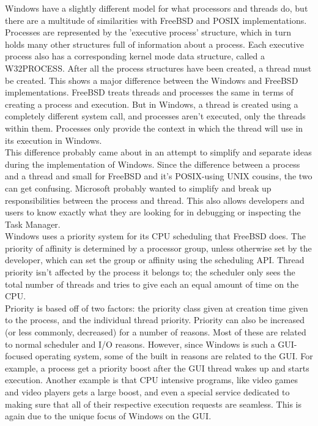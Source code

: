 \documentclass[titlepage]{article}
\begin{document}
\begin{singlespace}
    Windows have a slightly different model for what processors and threads do, but there are a multitude of similarities with FreeBSD and POSIX implementations. \\
    Processes are represented by the 'executive process' structure, which in turn holds many other structures full of information about a process. Each executive process also has a corresponding kernel mode data structure, called a W32PROCESS. After all the process structures have been created, a thread must be created. This shows a major difference between the Windows and FreeBSD implementations. FreeBSD treats threads and processes the same in terms of creating a process and execution. But in Windows, a thread is created using a completely different system call, and processes aren't executed, only the threads within them. Processes only provide the context in which the thread will use in its execution in Windows.\\
    This difference probably came about in an attempt to simplify and separate ideas during the implementation of Windows. Since the difference between a process and a thread and small for FreeBSD and it's POSIX-using UNIX cousins, the two can get confusing. Microsoft probably wanted to simplify and break up responsibilities between the process and thread. This also allows developers and users to know exactly what they are looking for in debugging or inspecting the Task Manager.\\
    Windows uses a priority system for its CPU scheduling that FreeBSD does. The priority of affinity is determined by a processor group, unless otherwise set by the developer, which can set the group or affinity using the scheduling API. Thread priority isn't affected by the process it belongs to; the scheduler only sees the total number of threads and tries to give each an equal amount of time on the CPU. \cite{windowsch5}\\
    Priority is based off of two factors: the priority class given at creation time given to the process, and the individual thread priority. Priority can also be increased (or less commonly, decreased) for a number of reasons. Most of these are related to normal scheduler and I/O reasons. However, since Windows is such a GUI-focused operating system, some of the built in reasons are related to the GUI. For example, a process get a priority boost after the GUI thread wakes up and starts execution. Another example is that CPU intensive programs, like video games and video players gets a large boost, and even a special service dedicated to making sure that all of their respective execution requests are seamless. This is again due to the unique focus of Windows on the GUI. \\

\end{singlespace}
\end{document}
